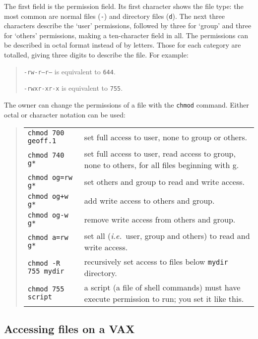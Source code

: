 The first field is the permission field.
Its first character shows the file type: the most common are normal files
({\tt -}) and directory files ({\tt d}).
The next three characters describe the `user' permissions, followed by three
for `group' and three for `others' permissions, making a ten-character field in
all.
The permissions can be described in octal format instead of by letters.
Those for each category are totalled, giving three digits to describe the file.
For example:
\begin{quote}
{\tt -rw-r--r--} is equivalent to {\tt 644}.

{\tt -rwxr-xr-x} is equivalent to {\tt 755}.
\end{quote}
The owner can change the permissions of a file with the {\tt chmod} command.
Either octal or character notation can be used:
\begin{quote}
\begin{tabular}{lp{4.0in}}

{\tt chmod 700 geoff.1} & set full access to user, none to group or others.\\

{\tt  chmod 740 g*}     & set full access to user, read access to group,
                        none to others, for all files beginning with g.\\

{\tt  chmod og=rw g*}   & set others and group to read and write access.\\

{\tt  chmod og+w g*}    & add write access to others and group.\\

{\tt  chmod og-w g*}    & remove write access from others and group.\\

{\tt  chmod a=rw g*}    & set all ({\em i.e.}\, user, group and others) to
                          read and write access.\\

{\tt  chmod -R 755 mydir} & recursively set access to files below {\tt mydir}
                           directory. \\

{\tt  chmod 755 script}  & a script (a file of shell commands) must have execute
                          permission to run; you set it like this.

\end{tabular}
\end{quote}

\subsection{Accessing files on a VAX}

